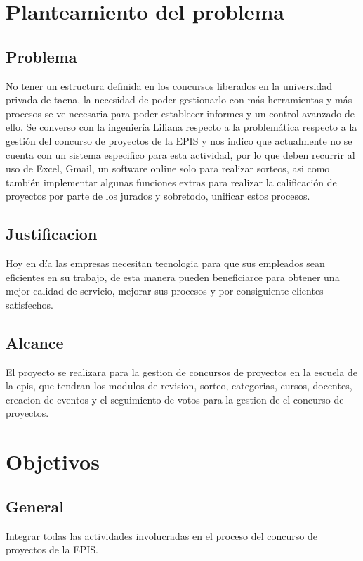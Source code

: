 \documentclass[%
 reprint,
 amsmath,amssymb,
 aps,
]{revtex4-1}
\begin{document}
\section{Planteamiento del problema}
\subsection{Problema}
No tener un estructura definida en los concursos liberados en la universidad privada de tacna, la necesidad de poder gestionarlo con más herramientas y más procesos se ve necesaria para poder establecer informes y un control avanzado de ello. 
Se converso con la ingeniería Liliana respecto a la problemática respecto a la gestión del concurso de proyectos de la EPIS y nos indico que actualmente no se cuenta con un sistema especifico para esta actividad, por lo que deben recurrir al uso de Excel, Gmail, un software online solo para realizar sorteos, asi como también implementar algunas funciones extras para realizar la calificación de proyectos por parte de los jurados y sobretodo, unificar estos procesos.

\subsection{Justificacion}
Hoy en día las empresas necesitan tecnologia para que sus empleados sean eficientes en su trabajo, de esta manera pueden beneficiarce para obtener una mejor calidad de servicio, mejorar sus procesos y por consiguiente clientes satisfechos.

\subsection{Alcance}
El proyecto se realizara para la gestion de concursos de proyectos en la escuela de la epis, que tendran los modulos de revision, sorteo, categorias, cursos, docentes, creacion de eventos y el seguimiento de votos para la gestion de el concurso de proyectos. 

\section {Objetivos}
\subsection {General}
Integrar todas las actividades involucradas en el proceso del concurso de proyectos de la EPIS.
\end{document}
